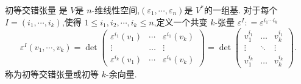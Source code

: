 \documentclass[../../几何与拓扑.tex]{subfiles}
\begin{document}
\begin{definition}{初等交错张量}
    是 $ V $是 $ n $-维线性空间,$ \left( \varepsilon_1,\cdots ,\varepsilon_{n} \right)  $是 $ V^{*} $的一组基.
    对于每个 $ I = \left( i_1,\cdots ,i_{k} \right)  $,使得 $ 1 \le i_1,i_2,\cdots,i_k\le  n $,定义一个共变 $ k $-张量 $ \varepsilon^{I}: = \varepsilon^{i_1\cdots i_{k}} $          $$
    \varepsilon^{I}\left( v_1,\cdots ,v_{k} \right)= \det \begin{pmatrix} 
        \varepsilon^{i_1}\left( v_1 \right) & \cdots  & \varepsilon^{i_1}\left( v_{k} \right)\\ 
         \vdots & \ldots & \vdots\\ 
          \varepsilon^{i_{k}}\left( v_1 \right)& \cdots & \varepsilon^{i_{k}} \left( v_{k} \right) 
    \end{pmatrix} = \det \begin{pmatrix}v_1^{i_1} & \ldots & v_{k}^{i_1}\\ \vdots & \ddots & \vdots\\ v_1^{i_{k}} & \ldots & v_{k}^{i_{k}}\end{pmatrix}.  
    $$称为初等交错张量或初等 $ k $-余向量. 
\end{definition}
\end{document}
